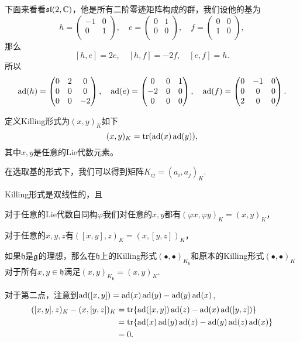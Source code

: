 下面来看看$\mathfrak{sl}(2,\mathbb{C})$，他是所有二阶零迹矩阵构成的群，我们设他的基为
\[
h=\begin{pmatrix}
	-1&0\\
	0&1\\
\end{pmatrix},\quad
e=\begin{pmatrix}
	0&1\\
	0&0\\
\end{pmatrix},\quad
f=\begin{pmatrix}
	0&0\\
	1&0\\
\end{pmatrix},
\]
那么
\[
[h,e]=2e,\quad[h,f]=-2f,\quad[e,f]=h.
\]
所以
\[
	\operatorname{ad}(h)=
		\begin{pmatrix}
			0&2&0\\
			0&0&0\\
			0&0&-2\\
		\end{pmatrix},\quad
	\operatorname{ad}(e)=
		\begin{pmatrix}
			0&0&1\\
			-2&0&0\\
			0&0&0\\
		\end{pmatrix},\quad
	\operatorname{ad}(f)=
		\begin{pmatrix}
			0&-1&0\\
			0&0&0\\
			2&0&0\\
		\end{pmatrix}.
\]

\para
定义Killing形式为$(x,y)_K$如下
\[
	(x,y)_K=\operatorname{tr}(\operatorname{ad}(x)\operatorname{ad}(y)),
\]
其中$x,y$是任意的Lie代数元素。

在选取基的形式下，我们可以得到矩阵$K_{ij}=(a_i,a_j)_K$.

\begin{theo}
Killing形式是双线性的，且

对于任意的Lie代数自同构$\varphi$我们对任意的$x,y$都有$(\varphi x,\varphi y)_K=(x,y)_K$，

对于任意的$x,y,z$有$([x,y],z)_K=(x,[y,z])_K$，

如果$\mathfrak{h}$是${\mathfrak{g}}$的理想，那么在$\mathfrak{h}$上的Killing形式$(\bullet,\bullet)_{K_\mathfrak{h}}$和原本的Killing形式$(\bullet,\bullet)_{K}$对于所有$x,y\in \mathfrak{h}$满足$(x,y)_{K_\mathfrak{h}}=(x,y)_K$.
\end{theo}

对于第二点，注意到$\operatorname{ad}([x,y])=\operatorname{ad}(x)\operatorname{ad}(y)-\operatorname{ad}(y)\operatorname{ad}(x)$,
\[
	\begin{split}
		([x,y],z)_K-(x,[y,z])_K&=\operatorname{tr}\{\operatorname{ad}([x,y])\operatorname{ad}(z)-\operatorname{ad}(x)\operatorname{ad}([y,z])\}\\
		&=\operatorname{tr}\{\operatorname{ad}(x)\operatorname{ad}(y)\operatorname{ad}(z)-\operatorname{ad}(y)\operatorname{ad}(z)\operatorname{ad}(x)\}\\
		&=0.
	\end{split}
\]

